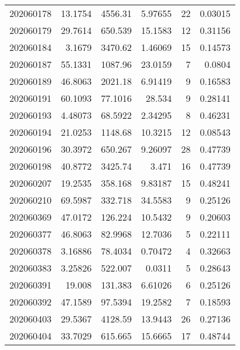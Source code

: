 \begin{tabular}{rrrrrr}
 202060178 &         13.1754  &     4556.31   &            5.97655 &          22 & 0.03015 \\
 202060179 &         29.7614  &      650.539  &           15.1583  &          12 & 0.31156 \\
 202060184 &          3.1679  &     3470.62   &            1.46069 &          15 & 0.14573 \\
 202060187 &         55.1331  &     1087.96   &           23.0159  &           7 & 0.0804  \\
 202060189 &         46.8063  &     2021.18   &            6.91419 &           9 & 0.16583 \\
 202060191 &         60.1093  &       77.1016 &           28.534   &           9 & 0.28141 \\
 202060193 &          4.48073 &       68.5922 &            2.34295 &           8 & 0.46231 \\
 202060194 &         21.0253  &     1148.68   &           10.3215  &          12 & 0.08543 \\
 202060196 &         30.3972  &      650.267  &            9.26097 &          28 & 0.47739 \\
 202060198 &         40.8772  &     3425.74   &            3.471   &          16 & 0.47739 \\
 202060207 &         19.2535  &      358.168  &            9.83187 &          15 & 0.48241 \\
 202060210 &         69.5987  &      332.718  &           34.5583  &           9 & 0.25126 \\
 202060369 &         47.0172  &      126.224  &           10.5432  &           9 & 0.20603 \\
 202060377 &         46.8063  &       82.9968 &           12.7036  &           5 & 0.22111 \\
 202060378 &          3.16886 &       78.4034 &            0.70472 &           4 & 0.32663 \\
 202060383 &          3.25826 &      522.007  &            0.0311  &           5 & 0.28643 \\
 202060391 &         19.008   &      131.383  &            6.61026 &           6 & 0.25126 \\
 202060392 &         47.1589  &       97.5394 &           19.2582  &           7 & 0.18593 \\
 202060403 &         29.5367  &     4128.59   &           13.9443  &          26 & 0.27136 \\
 202060404 &         33.7029  &      615.665  &           15.6665  &          17 & 0.48744 \\

\end{tabular}
